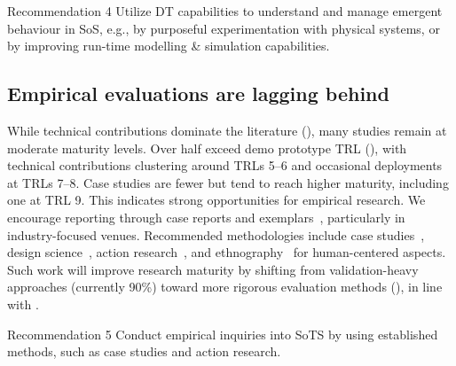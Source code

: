 \begin{recoframe}{Recommendation 4}
Utilize DT capabilities to understand and manage emergent behaviour in SoS, e.g., by purposeful experimentation with physical systems, or by improving run-time modelling \& simulation capabilities.
\end{recoframe}


\subsection{Empirical evaluations are lagging behind}

While technical contributions dominate the literature (), many studies remain at moderate maturity levels. Over half exceed demo prototype TRL (), with technical contributions clustering around TRLs 5--6 and occasional deployments at TRLs 7--8. Case studies are fewer but tend to reach higher maturity, including one at TRL 9. This indicates strong opportunities for empirical research. We encourage reporting through case reports and exemplars~\cite{mezard2007where}, particularly in industry-focused venues. Recommended methodologies include case studies~\cite{wohlin2021case}, design science~\cite{dresch2015design}, action research~\cite{cohen2017research}, and ethnography~\cite{sharp2010using} for human-centered aspects. Such work will improve research maturity by shifting from validation-heavy approaches (currently 90\%) toward more rigorous evaluation methods (), in line with \textcite{petersen2015guidelines}.

\begin{recoframe}{Recommendation 5}
Conduct empirical inquiries into SoTS by using established methods, such as case studies and action research.
\end{recoframe}